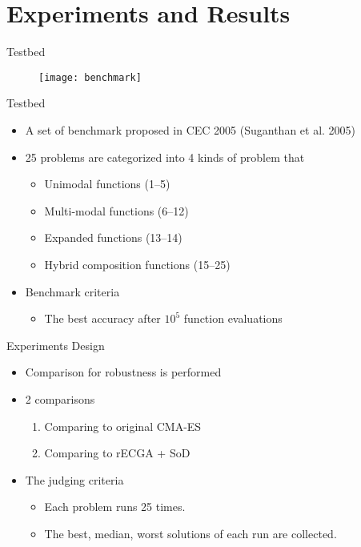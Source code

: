 \section{Experiments and Results}

\begin{frame}{Testbed}
  \begin{figure}
    \centering
  \texttt{[image: benchmark]}
\end{figure}
\end{frame}

\begin{frame}{Testbed}
  \begin{itemize}
    \item A set of benchmark proposed in CEC 2005 (Suganthan et al. 2005) 
      \vspace*{14pt}
    \item 25 problems are categorized into 4 kinds of problem that
      \begin{itemize}
        \item \alert{U}nimodal functions (1--5)
        \item \alert{M}ulti-modal functions (6--12)
        \item \alert{E}xpanded functions (13--14)
        \item \alert{H}ybrid composition functions (15--25)
      \end{itemize}
      \vspace*{14pt}
    \item Benchmark criteria
      \begin{itemize}
        \item The best accuracy after $10^5$ function evaluations
      \end{itemize}
  \end{itemize}
\end{frame}


\begin{frame}{Experiments Design}
  \begin{itemize}
    \item Comparison for robustness is performed
      \vspace*{14pt}
    \item 2 comparisons
      \begin{enumerate}
        \item Comparing to original CMA-ES 
        \item Comparing to rECGA + SoD
      \end{enumerate}
      \vspace*{14pt}
    \item The judging criteria
      \begin{itemize}
        \item Each problem runs 25 times.
        \item The best, median, worst solutions of each run are collected.
      \end{itemize}
  \end{itemize}
\end{frame}


